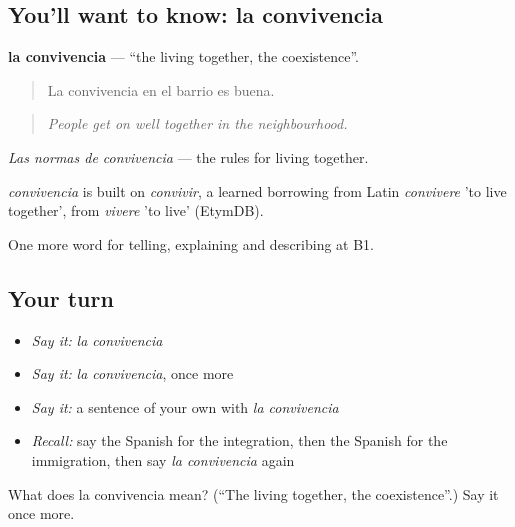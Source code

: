 \subsection*{You'll want to know: la convivencia}
\textbf{la convivencia} — \textquotedblleft{}the living together, the coexistence\textquotedblright{}.

\begin{quote}
La convivencia en el barrio es buena.
\end{quote}

\begin{quote}
\emph{People get on well together in the neighbourhood.}
\end{quote}

\emph{Las normas de convivencia} — the rules for living together.

\begin{cousinweb}
\emph{convivencia} is built on \emph{convivir}, a learned borrowing from Latin \emph{convivere} 'to live together', from \emph{vivere} 'to live' (EtymDB).
\end{cousinweb}

\begin{grammarlens}[title={What you've built}]
One more word for telling, explaining and describing at B1.
\end{grammarlens}

\subsection*{Your turn}
\begin{itemize}
\raggedright
  \item \emph{Say it:} \emph{la convivencia}
  \item \emph{Say it:} \emph{la convivencia}, once more
  \item \emph{Say it:} a sentence of your own with \emph{la convivencia}
  \item \emph{Recall:} say the Spanish for the integration, then the Spanish for the immigration, then say \emph{la convivencia} again
\end{itemize}

\begin{tcolorbox}[breakable,colback=teal!4,colframe=teal!35!black,title={Before you move on}]
What does la convivencia mean? (\textquotedblleft{}The living together, the coexistence\textquotedblright{}.) Say it once more.
\end{tcolorbox}
